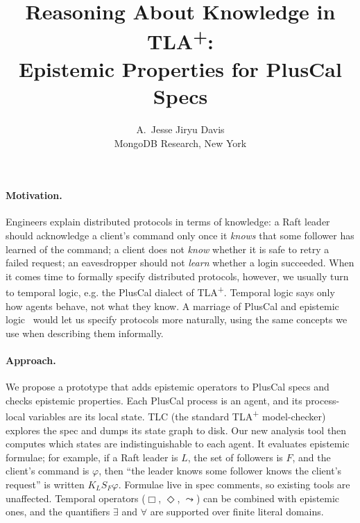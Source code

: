 \documentclass[10pt]{article}
\title{\vspace{-1.5em}Reasoning About Knowledge in TLA\textsuperscript{+}:\\Epistemic Properties for PlusCal Specs}
\author{A.\ Jesse Jiryu Davis\\MongoDB Research, New York}
\date{}
\begin{document}
\maketitle
\vspace{-2em}

\paragraph{Motivation.}
Engineers explain distributed protocols in terms of knowledge: a Raft leader should acknowledge a client's command only once it \emph{knows} that some follower has learned of the command; a client does not \emph{know} whether it is safe to retry a failed request; an eavesdropper should not \emph{learn} whether a login succeeded.
When it comes time to formally specify distributed protocols, however, we usually turn to temporal logic, e.g. the PlusCal dialect of TLA\textsuperscript{+}. Temporal logic says only how agents behave, not what they know. A marriage of PlusCal and epistemic logic~\cite{halpern-moses,fagin} would let us specify protocols more naturally, using the same concepts we use when describing them informally.

\paragraph{Approach.}
We propose a prototype that adds epistemic operators to PlusCal specs and checks epistemic properties.
Each PlusCal process is an agent, and its process-local variables are its local state.
TLC (the standard TLA\textsuperscript{+} model-checker) explores the spec and dumps its state graph to disk. Our new analysis tool then computes which states are indistinguishable to each agent.
It evaluates epistemic formulae; for example, if a Raft leader is $L$, the set of followers is $F$, and the client's command is $\varphi$, then ``the leader knows some follower knows the client's request'' is written $K_{L} S_{F} \varphi$.
Formulae live in spec comments, so existing tools are unaffected.
Temporal operators ($\Box$, $\Diamond$, $\leadsto$) can be combined with epistemic ones, and the quantifiers $\exists$ and $\forall$ are supported over finite literal domains.
\end{document}
